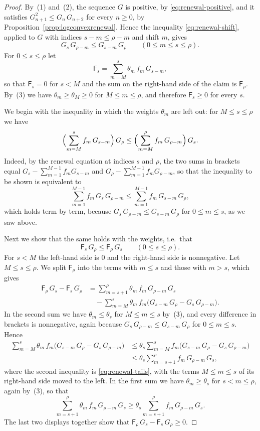 \documentclass{amsart}
\theoremstyle{definition}
\theoremstyle{remark}
\numberwithin{equation}{section}
\begin{document}
\begin{proof}
By~(1) and~(2), the sequence $G$ is positive, by \eqref{eq:renewal-positive}, and it satisfies $G_{n+1}^2\le G_n\,G_{n+2}$ for every $n\ge 0$, by Proposition~\ref{prop:logconvexrenewal}. Hence the inequality \eqref{eq:renewal-shift}, applied to $G$ with indices $s-m\le\rho-m$ and shift $m$, gives
\[
G_s\,G_{\rho-m}\le G_{s-m}\,G_\rho\qquad(0\le m\le s\le\rho).
\]
For $0\le s\le\rho$ let
\[
\mathsf{F}_s=\sum_{m=M}^{s}\theta_m\,f_m\,G_{s-m},
\]
so that $\mathsf{F}_s=0$ for $s<M$ and the sum on the right-hand side of the claim is $\mathsf{F}_\rho$. By~(3) we have $\theta_m\ge\theta_M\ge 0$ for $M\le m\le\rho$, and therefore $\mathsf{F}_s\ge 0$ for every $s$.

We begin with the inequality in which the weights $\theta_m$ are left out: for $M\le s\le\rho$ we have
\begin{equation}\label{eq:renewal-tails}
\Bigl(\sum_{m=M}^{s}f_m\,G_{s-m}\Bigr)\,G_\rho\le\Bigl(\sum_{m=M}^{\rho}f_m\,G_{\rho-m}\Bigr)\,G_s .
\end{equation}
Indeed, by the renewal equation at indices $s$ and $\rho$, the two sums in brackets equal $G_s-\sum_{m=1}^{M-1}f_mG_{s-m}$ and $G_\rho-\sum_{m=1}^{M-1}f_mG_{\rho-m}$, so that the inequality to be shown is equivalent to
\[
\sum_{m=1}^{M-1}f_m\,G_s\,G_{\rho-m}\le\sum_{m=1}^{M-1}f_m\,G_{s-m}\,G_\rho ,
\]
which holds term by term, because $G_s\,G_{\rho-m}\le G_{s-m}\,G_\rho$ for $0\le m\le s$, as we saw above.

Next we show that the same holds with the weights, i.e.\ that
\begin{equation}\label{eq:renewal-weighted}
\mathsf{F}_s\,G_\rho\le\mathsf{F}_\rho\,G_s\qquad(0\le s\le\rho).
\end{equation}
For $s<M$ the left-hand side is $0$ and the right-hand side is nonnegative. Let $M\le s\le\rho$. We split $\mathsf{F}_\rho$ into the terms with $m\le s$ and those with $m>s$, which gives
\begin{align*}
\mathsf{F}_\rho\,G_s-\mathsf{F}_s\,G_\rho
&=\sum_{m=s+1}^{\rho}\theta_m\,f_m\,G_{\rho-m}\,G_s\\
&\quad-\sum_{m=M}^{s}\theta_m\,f_m\bigl(G_{s-m}\,G_\rho-G_s\,G_{\rho-m}\bigr).
\end{align*}
In the second sum we have $\theta_m\le\theta_s$ for $M\le m\le s$ by~(3), and every difference in brackets is nonnegative, again because $G_s\,G_{\rho-m}\le G_{s-m}\,G_\rho$ for $0\le m\le s$. Hence
\begin{align*}
\sum_{m=M}^{s}\theta_m\,f_m\bigl(G_{s-m}\,G_\rho-G_s\,G_{\rho-m}\bigr)
&\le\theta_s\sum_{m=M}^{s}f_m\bigl(G_{s-m}\,G_\rho-G_s\,G_{\rho-m}\bigr)\\
&\le\theta_s\sum_{m=s+1}^{\rho}f_m\,G_{\rho-m}\,G_s ,
\end{align*}
where the second inequality is \eqref{eq:renewal-tails}, with the terms $M\le m\le s$ of its right-hand side moved to the left. In the first sum we have $\theta_m\ge\theta_s$ for $s<m\le\rho$, again by~(3), so that
\[
\sum_{m=s+1}^{\rho}\theta_m\,f_m\,G_{\rho-m}\,G_s\ge\theta_s\sum_{m=s+1}^{\rho}f_m\,G_{\rho-m}\,G_s .
\]
The last two displays together show that $\mathsf{F}_\rho\,G_s-\mathsf{F}_s\,G_\rho\ge 0$.


\end{proof}
\end{document}
